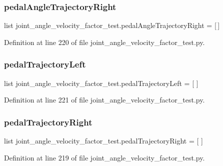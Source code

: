 \subsubsection{\texorpdfstring{pedalAngleTrajectoryRight}{pedalAngleTrajectoryRight}}
{\footnotesize\ttfamily list joint\+\_\+angle\+\_\+velocity\+\_\+factor\+\_\+test.\+pedal\+Angle\+Trajectory\+Right = \mbox{[}$\,$\mbox{]}}



Definition at line 220 of file joint\+\_\+angle\+\_\+velocity\+\_\+factor\+\_\+test.\+py.

\mbox{\label{namespacejoint__angle__velocity__factor__test_ac2eee94a33690d825ecb1befd573a755}} 
\subsubsection{\texorpdfstring{pedalTrajectoryLeft}{pedalTrajectoryLeft}}
{\footnotesize\ttfamily list joint\+\_\+angle\+\_\+velocity\+\_\+factor\+\_\+test.\+pedal\+Trajectory\+Left = \mbox{[} \mbox{]}}



Definition at line 221 of file joint\+\_\+angle\+\_\+velocity\+\_\+factor\+\_\+test.\+py.

\mbox{\label{namespacejoint__angle__velocity__factor__test_a84eff6687be83c44fc35010c2b33da0c}} 
\subsubsection{\texorpdfstring{pedalTrajectoryRight}{pedalTrajectoryRight}}
{\footnotesize\ttfamily list joint\+\_\+angle\+\_\+velocity\+\_\+factor\+\_\+test.\+pedal\+Trajectory\+Right = \mbox{[} \mbox{]}}



Definition at line 219 of file joint\+\_\+angle\+\_\+velocity\+\_\+factor\+\_\+test.\+py.

